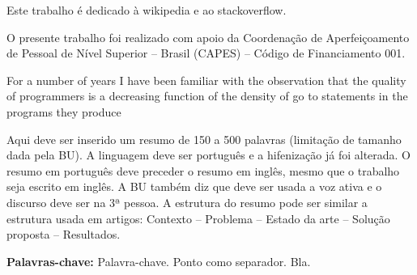 \documentclass[embeddedlogo]{ufsc-thesis-rn46-2019}
\begin{document}

\pretextual%
\imprimircapa%
\imprimirfolhaderosto*
\protect{}
\imprimirfolhadecertificacao



\begin{dedicatoria}
  Este trabalho é dedicado à wikipedia e ao stackoverflow. 
\end{dedicatoria}

\begin{agradecimentos}
  O presente trabalho foi realizado com apoio da Coordenação de Aperfeiçoamento de Pessoal de Nível Superior -- Brasil (CAPES) -- Código de Financiamento 001.
\end{agradecimentos}

\begin{epigrafe}
  For a number of years I have been familiar with the observation that the quality of programmers is a decreasing function of the density of go to statements in the programs they produce \\
  \cite{dijkstra1968}
\end{epigrafe}


\begin{resumo}[Resumo]
  Aqui deve ser inserido um resumo de 150 a 500 palavras (limitação de tamanho dada pela BU). A linguagem deve ser português e a hifenização já foi alterada. O resumo em português deve preceder o resumo em inglês, mesmo que o trabalho seja escrito em inglês. A BU também diz que deve ser usada a voz ativa e o discurso deve ser na 3ª pessoa. A estrutura do resumo pode ser similar a estrutura usada em artigos: Contexto -- Problema -- Estado da arte -- Solução proposta  -- Resultados.

  \vspace{\baselineskip} 
  \textbf{Palavras-chave:} Palavra-chave. Ponto como separador. Bla.
\end{resumo}
\end{document}
